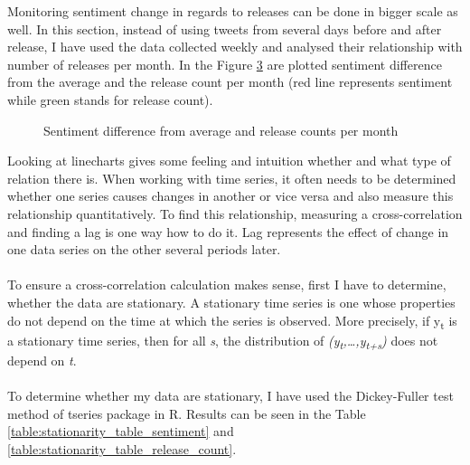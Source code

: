 Monitoring sentiment change in regards to releases can be done in bigger scale as well. In this section, instead of using tweets from several days before and after release, I have used the data collected weekly and analysed their relationship with number of releases per month. In the Figure \ref{fig:ReleasesSentiment3} are plotted sentiment difference from the average and the release count per month (red line represents sentiment while green stands for release count).

\begin{figure}[H]%
    \centering
    \qquad
    \label{fig:ReleasesSentiment1}%
\end{figure}


\begin{figure}[H]%
    \centering
    \qquad
    \label{fig:ReleasesSentiment2}%
\end{figure}


\begin{figure}[H]%
    \centering
    \qquad
        \caption{Sentiment difference from average and release counts per month}
    \label{fig:ReleasesSentiment3}%
\end{figure}

Looking at linecharts gives some feeling and intuition whether and what type of relation there is. When working with time series, it often needs to be determined whether one series causes changes in another or vice versa and also measure this relationship quantitatively. To find this relationship, measuring a cross-correlation and finding a lag is one way how to do it. Lag represents the effect of change in one data series on the other several periods later. \\
\\
To ensure a cross-correlation calculation makes sense, first I have to determine, whether the data are stationary. A stationary time series is one whose properties do not depend on the time at which the series is observed\cite{hyndman5forecast}. More precisely, if y\textsubscript{t} is a stationary time series, then for all \textit{s}, the distribution of \textit{(y\textsubscript{t},…,y\textsubscript{t+s})} does not depend on \textit{t}.\\
\\
To determine whether my data are stationary, I have used the Dickey-Fuller test method of tseries package in R. Results can be seen in the Table \ref{table:stationarity_table_sentiment} and \ref{table:stationarity_table_release_count}.

